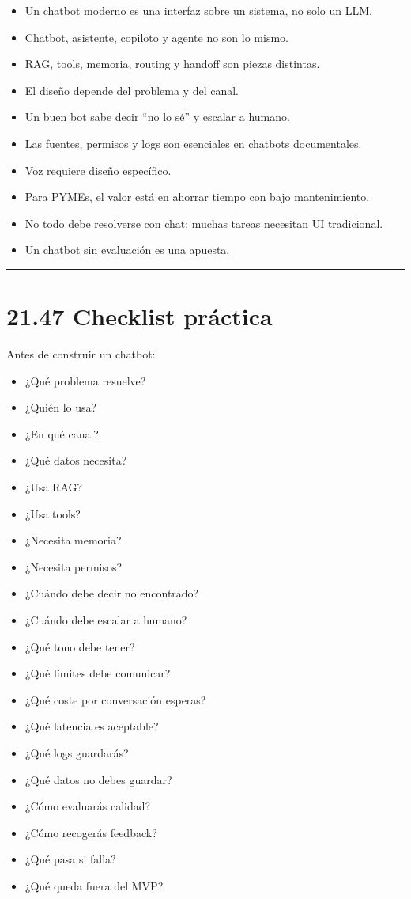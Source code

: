 \begin{itemize}
\tightlist
\item
  Un chatbot moderno es una interfaz sobre un sistema, no solo un LLM.
\item
  Chatbot, asistente, copiloto y agente no son lo mismo.
\item
  RAG, tools, memoria, routing y handoff son piezas distintas.
\item
  El diseño depende del problema y del canal.
\item
  Un buen bot sabe decir ``no lo sé'' y escalar a humano.
\item
  Las fuentes, permisos y logs son esenciales en chatbots documentales.
\item
  Voz requiere diseño específico.
\item
  Para PYMEs, el valor está en ahorrar tiempo con bajo mantenimiento.
\item
  No todo debe resolverse con chat; muchas tareas necesitan UI
  tradicional.
\item
  Un chatbot sin evaluación es una apuesta.
\end{itemize}

\begin{center}\rule{0.5\linewidth}{0.5pt}\end{center}

\section{21.47 Checklist práctica}\label{checklist-pruxe1ctica-20}

Antes de construir un chatbot:

\begin{itemize}
\tightlist
\item
  ¿Qué problema resuelve?
\item
  ¿Quién lo usa?
\item
  ¿En qué canal?
\item
  ¿Qué datos necesita?
\item
  ¿Usa RAG?
\item
  ¿Usa tools?
\item
  ¿Necesita memoria?
\item
  ¿Necesita permisos?
\item
  ¿Cuándo debe decir no encontrado?
\item
  ¿Cuándo debe escalar a humano?
\item
  ¿Qué tono debe tener?
\item
  ¿Qué límites debe comunicar?
\item
  ¿Qué coste por conversación esperas?
\item
  ¿Qué latencia es aceptable?
\item
  ¿Qué logs guardarás?
\item
  ¿Qué datos no debes guardar?
\item
  ¿Cómo evaluarás calidad?
\item
  ¿Cómo recogerás feedback?
\item
  ¿Qué pasa si falla?
\item
  ¿Qué queda fuera del MVP?
\end{itemize}

